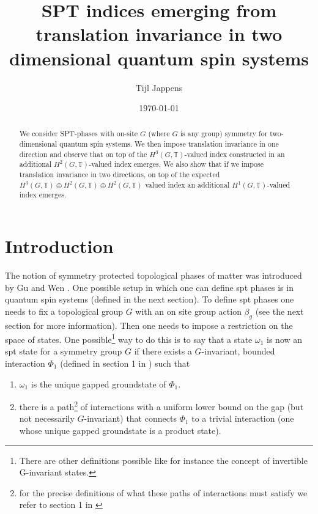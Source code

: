 \documentclass[12pt,a4paper,twoside]{article}
\title{SPT indices emerging from translation invariance in two dimensional quantum spin systems}
\author{Tijl Jappens}
\date{\today}
\newcommand{\TT}{\mathbb T}
\theoremstyle{definition}
\numberwithin{equation}{section}
\begin{document}
\maketitle	
\begin{abstract}
	We consider SPT-phases with on-site $G$ (where $G$ is any group) symmetry for two-dimensional quantum spin systems. We then impose translation invariance in one direction and observe that on top of the $H^3(G,\TT)$-valued index constructed in \cite{ogata2021h3gmathbb} an additional $H^2(G,\TT)$-valued index emerges. We also show that if we impose translation invariance in two directions, on top of the expected $H^3(G,\TT)\oplus H^2(G,\TT)\oplus H^2(G,\TT)$ valued index an additional $H^1(G,\TT)$-valued index emerges.
\end{abstract}
\section{Introduction}
The notion of symmetry protected topological phases of matter was introduced by Gu and Wen \cite{Chen_2013}. One possible setup in which one can define spt phases is in quantum spin systems (defined in the next section). To define spt phases one needs to fix a topological group $G$ with an on site group action $\beta_g$ (see the next section for more information). Then one needs to impose a restriction on the space of states. One possible\footnote{There are other definitions possible like for instance the concept of invertible G-invariant states.} way to do this is to say that a state $\omega_1$ is now an spt state for a symmetry group $G$ if there exists a $G$-invariant, bounded interaction $\Phi_1$ (defined in section 1 in \cite{ogata2021h3gmathbb}) such that
\begin{enumerate}
	\item $\omega_1$ is the unique gapped groundstate of $\Phi_1$.
	\item there is a path\footnote{for the precise definitions of what these paths of interactions must satisfy we refer to section 1 in \cite{ogata2021h3gmathbb}} of interactions with a uniform lower bound on the gap (but not necessarily $G$-invariant) that connects $\Phi_1$ to a trivial interaction (one whose unique gapped groundstate is a product state).
\end{enumerate}
\end{document}
